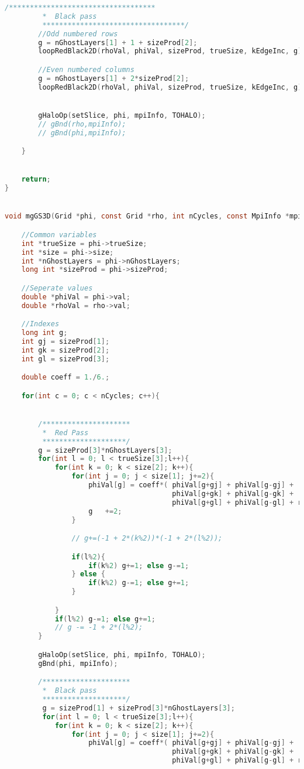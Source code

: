 \begin{lstlisting}[language=c, caption = main routine]
		/***********************************
		 *	Black pass
		 **********************************/
		//Odd numbered rows
		g = nGhostLayers[1] + 1 + sizeProd[2];
		loopRedBlack2D(rhoVal, phiVal, sizeProd, trueSize, kEdgeInc, g);

		//Even numbered columns
		g = nGhostLayers[1] + 2*sizeProd[2];
		loopRedBlack2D(rhoVal, phiVal, sizeProd, trueSize, kEdgeInc, g);


		gHaloOp(setSlice, phi, mpiInfo, TOHALO);
		// gBnd(rho,mpiInfo);
		// gBnd(phi,mpiInfo);

	}


	return;
}


void mgGS3D(Grid *phi, const Grid *rho, int nCycles, const MpiInfo *mpiInfo){

	//Common variables
	int *trueSize = phi->trueSize;
	int *size = phi->size;
	int *nGhostLayers = phi->nGhostLayers;
	long int *sizeProd = phi->sizeProd;

	//Seperate values
	double *phiVal = phi->val;
	double *rhoVal = rho->val;

	//Indexes
	long int g;
	int gj = sizeProd[1];
	int gk = sizeProd[2];
	int gl = sizeProd[3];

	double coeff = 1./6.;

	for(int c = 0; c < nCycles; c++){


		/*********************
		 *	Red Pass
		 ********************/
		g = sizeProd[3]*nGhostLayers[3];
		for(int l = 0; l < trueSize[3];l++){
			for(int k = 0; k < size[2]; k++){
				for(int j = 0; j < size[1]; j+=2){
					phiVal[g] = coeff*(	phiVal[g+gj] + phiVal[g-gj] +
										phiVal[g+gk] + phiVal[g-gk] +
										phiVal[g+gl] + phiVal[g-gl] + rhoVal[g]);
					g	+=2;
				}

				// g+=(-1 + 2*(k%2))*(-1 + 2*(l%2));

				if(l%2){
					if(k%2)	g+=1; else g-=1;
				} else {
					if(k%2) g-=1; else g+=1;
				}

			}
			if(l%2) g-=1; else g+=1;
			// g -= -1 + 2*(l%2);
		}

		gHaloOp(setSlice, phi, mpiInfo, TOHALO);
		gBnd(phi, mpiInfo);

		/*********************
		 *	Black pass
		 ********************/
		 g = sizeProd[1] + sizeProd[3]*nGhostLayers[3];
		 for(int l = 0; l < trueSize[3];l++){
		 	for(int k = 0; k < size[2]; k++){
		 		for(int j = 0; j < size[1]; j+=2){
		 			phiVal[g] = coeff*(	phiVal[g+gj] + phiVal[g-gj] +
		 								phiVal[g+gk] + phiVal[g-gk] +
		 								phiVal[g+gl] + phiVal[g-gl] + rhoVal[g]);


\end{lstlisting}

